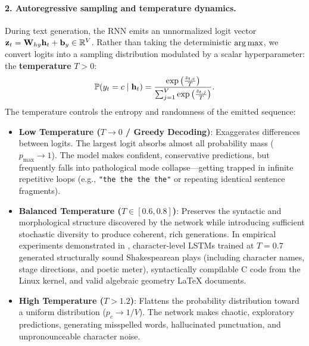 \documentclass[../../main.tex]{subfiles}
\begin{document}
\paragraph{2. Autoregressive sampling and temperature dynamics.}
During text generation, the RNN emits an unnormalized logit vector $\mathbf{z}_t = \mathbf{W}_{hy} \mathbf{h}_t + \mathbf{b}_y \in \mathbb{R}^V$. Rather than taking the deterministic $\operatorname*{\mathrm{arg\,max}}$, we convert logits into a sampling distribution modulated by a scalar hyperparameter: the \textbf{temperature} $T > 0$:
\begin{equation}
\label{eq:temperature_sampling}
\mathbb{P}(y_t = c \mid \mathbf{h}_t) = \frac{\exp\left( \frac{z_{t, c}}{T} \right)}{\sum_{j=1}^V \exp\left( \frac{z_{t, j}}{T} \right)}.
\end{equation}
The temperature controls the entropy and randomness of the emitted sequence:
\begin{itemize}
    \item \textbf{Low Temperature ($T \to 0$ / Greedy Decoding)}: Exaggerates differences between logits. The largest logit absorbs almost all probability mass ($p_{\max} \to 1$). The model makes confident, conservative predictions, but frequently falls into pathological mode collapse---getting trapped in infinite repetitive loops (e.g., \texttt{"the the the the"} or repeating identical sentence fragments).
    \item \textbf{Balanced Temperature ($T \in [0.6, 0.8]$)}: Preserves the syntactic and morphological structure discovered by the network while introducing sufficient stochastic diversity to produce coherent, rich generations. In empirical experiments demonstrated in \cite{karpathy2015rnn}, character-level LSTMs trained at $T=0.7$ generated structurally sound Shakespearean plays (including character names, stage directions, and poetic meter), syntactically compilable C code from the Linux kernel, and valid algebraic geometry LaTeX documents.
    \item \textbf{High Temperature ($T > 1.2$)}: Flattens the probability distribution toward a uniform distribution ($p_c \to 1/V$). The network makes chaotic, exploratory predictions, generating misspelled words, hallucinated punctuation, and unpronounceable character noise.
\end{itemize}
\end{document}
